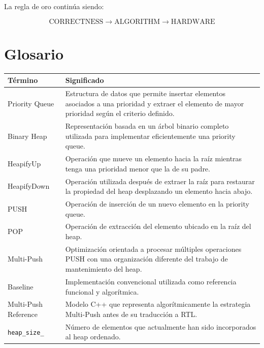 \documentclass[11pt,a4paper]{article}
\begin{document}
La regla de oro continúa siendo:

\[
\boxed{
\text{CORRECTNESS}
\rightarrow
\text{ALGORITHM}
\rightarrow
\text{HARDWARE}
}
\]

\section{Glosario}

\begin{longtable}{p{} p{}}
\toprule
\textbf{Término} & \textbf{Significado} \\
\midrule
\endhead

Priority Queue &
Estructura de datos que permite insertar elementos asociados a una
prioridad y extraer el elemento de mayor prioridad según el criterio
definido. \\

Binary Heap &
Representación basada en un árbol binario completo utilizada para
implementar eficientemente una priority queue. \\

HeapifyUp &
Operación que mueve un elemento hacia la raíz mientras tenga una
prioridad menor que la de su padre. \\

HeapifyDown &
Operación utilizada después de extraer la raíz para restaurar la
propiedad del heap desplazando un elemento hacia abajo. \\

PUSH &
Operación de inserción de un nuevo elemento en la priority queue. \\

POP &
Operación de extracción del elemento ubicado en la raíz del heap. \\

Multi-Push &
Optimización orientada a procesar múltiples operaciones PUSH con una
organización diferente del trabajo de mantenimiento del heap. \\

Baseline &
Implementación convencional utilizada como referencia funcional y
algorítmica. \\

Multi-Push Reference &
Modelo C++ que representa algorítmicamente la estrategia Multi-Push antes
de su traducción a RTL. \\

\texttt{heap\_size\_} &
Número de elementos que actualmente han sido incorporados al heap
ordenado. \\


\end{longtable}
\end{document}
